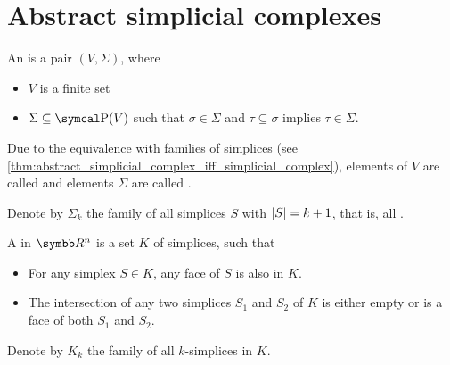 \section{Abstract simplicial complexes}\label{sec:abstract_simplicial_complexes}

\begin{definition}\label{def:abstract_simplicial_complex}\cite[definition 2.1]{Carlsson2009}
  An  is a pair \( (V, \Sigma) \), where
  \begin{itemize}
    \item \( V \) is a finite set
    \item \( \Sigma \subseteq \Power(V) \) such that \( \sigma \in \Sigma \) and \( \tau \subseteq \sigma \) implies \( \tau \in \Sigma \).
  \end{itemize}

  Due to the equivalence with families of simplices (see \cref{thm:abstract_simplicial_complex_iff_simplicial_complex}), elements of \( V \) are called  and elements \( \Sigma \) are called .

  Denote by \( \Sigma_k \) the family of all simplices \( S \) with \( \left\vert S \right\vert = k + 1 \), that is, all .
\end{definition}

\begin{definition}\label{def:simplicial_complex}
  A  in \( \BB{R}^n \) is a set \( K \) of simplices, such that
  \begin{itemize}
    \item For any simplex \( S \in K \), any face of \( S \) is also in \( K \).
    \item The intersection of any two simplices \( S_1 \) and \( S_2 \) of \( K \) is either empty or is a face of both \( S_1 \) and \( S_2 \).
  \end{itemize}

  Denote by \( K_k \) the family of all \( k \)-simplices in \( K \).
\end{definition}

